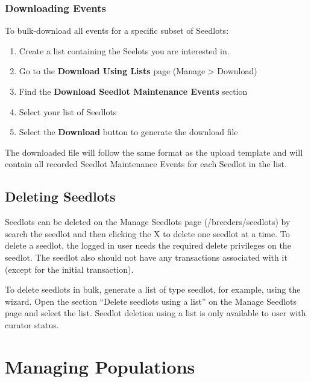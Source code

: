 \documentclass[
  12pt,
]{book}
\providecommand{\tightlist}{%
  \setlength{\itemsep}{0pt}\setlength{\parskip}{0pt}}
\begin{document}
\hypertarget{downloading-events}{%
\subsection{Downloading Events}\label{downloading-events}}

To bulk-download all events for a specific subset of Seedlots:

\begin{enumerate}
\def\labelenumi{\arabic{enumi}.}
\tightlist
\item
  Create a list containing the Seelots you are interested in.
\item
  Go to the \textbf{Download Using Lists} page (Manage \textgreater{} Download)
\item
  Find the \textbf{Download Seedlot Maintenance Events} section
\item
  Select your list of Seedlots
\item
  Select the \textbf{Download} button to generate the download file
\end{enumerate}

The downloaded file will follow the same format as the upload template and will contain all recorded Seedlot Maintenance Events for each Seedlot in the list.

\hypertarget{deleting-seedlots}{%
\section{Deleting Seedlots}\label{deleting-seedlots}}

Seedlots can be deleted on the Manage Seedlots page (/breeders/seedlots) by search the seedlot and then clicking the X to delete one seedlot at a time. To delete a seedlot, the logged in user needs the required delete privileges on the seedlot. The seedlot also should not have any transactions associated with it (except for the initial transaction).

To delete seedlots in bulk, generate a list of type seedlot, for example, using the wizard. Open the section ``Delete seedlots using a list'' on the Manage Seedlots page and select the list. Seedlot deletion using a list is only available to user with curator status.

\hypertarget{managing-populations}{%
\chapter{Managing Populations}\label{managing-populations}}
\end{document}
